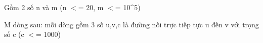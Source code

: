 Gồm 2 số n và m (n $<$= 20, m $<$= 10\textasciicircum5)

M dòng sau: mỗi dòng gồm 3 số u,v,c là đường nối trực tiếp tực u đến v với trọng số c (c $<$= 1000)